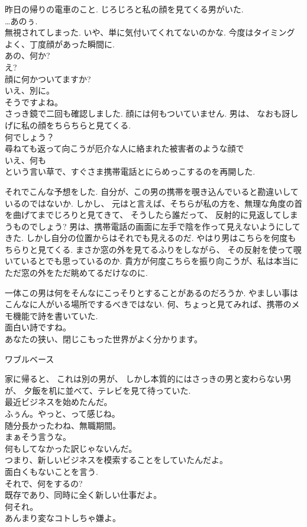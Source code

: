 昨日の帰りの電車のこと.
じろじろと私の顔を見てくる男がいた.\\
…あのぅ.
\\
無視されてしまった.
いや、単に気付いてくれてないのかな.
今度はタイミングよく、丁度顔があった瞬間に.\\
あの、何か?\\
え?\\
顔に何かついてますか?\\
いえ、別に。\\
そうですよね。\\
さっき鏡で二回も確認しました.
顔には何もついていません.
男は、
なおも訝しげに私の顔をちらちらと見てくる.\\
何でしょう？\\
尋ねても返って向こうが厄介な人に絡まれた被害者のような顔で\\
いえ、何も\\
という言い草で、すぐさま携帯電話とにらめっこするのを再開した.

それでこんな予想をした.
自分が、この男の携帯を覗き込んでいると勘違いしているのではないか.
しかし、
元はと言えば、そちらが私の方を、無理な角度の首を曲げてまでじろりと見てきて、
そうしたら誰だって、
反射的に見返してしまうものでしょう?
男は、携帯電話の画面に左手で陰を作って見えないようにしてきた.
しかし自分の位置からはそれでも見えるのだ.
やはり男はこちらを何度もちらりと見てくる.
まさか窓の外を見てるふりをしながら、
その反射を使って覗いているとでも思っているのか.
貴方が何度こちらを振り向こうが、私は本当にただ窓の外をただ眺めてるだけなのに.

一体この男は何をそんなにこっそりとすることがあるのだろうか.
やましい事はこんなに人がいる場所でするべきではない.
何、ちょっと見てみれば、携帯のメモ機能で詩を書いていた.\\
面白い詩ですね。\\
あなたの狭い、閉じこもった世界がよく分かります。

\vspace*{4mm}
ワブルベース
\vspace*{4mm}

家に帰ると、
これは別の男が、
しかし本質的にはさっきの男と変わらない男が、
夕飯を机に並べて、テレビを見て待っていた.\\
最近ビジネスを始めたんだ。\\
ふぅん。やっと、って感じね。\\
随分長かったわね、無職期間。\\
まぁそう言うな。\\
何もしてなかった訳じゃないんだ。\\
つまり、新しいビジネスを模索することをしていたんだよ。\\
面白くもないことを言う.\\
それで、何をするの?\\
既存であり、同時に全く新しい仕事だよ。\\
何それ。\\
あんまり変なコトしちゃ嫌よ。\\

